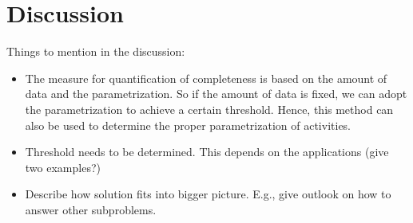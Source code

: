 \section{Discussion}
\label{sec:discussion}



\color{red}

Things to mention in the discussion:
\begin{itemize}
	\item The measure for quantification of completeness is based on the amount of data and the parametrization. So if the amount of data is fixed, we can adopt the parametrization to achieve a certain threshold. Hence, this method can also be used to determine the proper parametrization of activities.
	\item Threshold needs to be determined. This depends on the applications (give two examples?)
	\item Describe how solution fits into bigger picture. E.g., give outlook on how to answer other subproblems.
\end{itemize}

\color{black}
